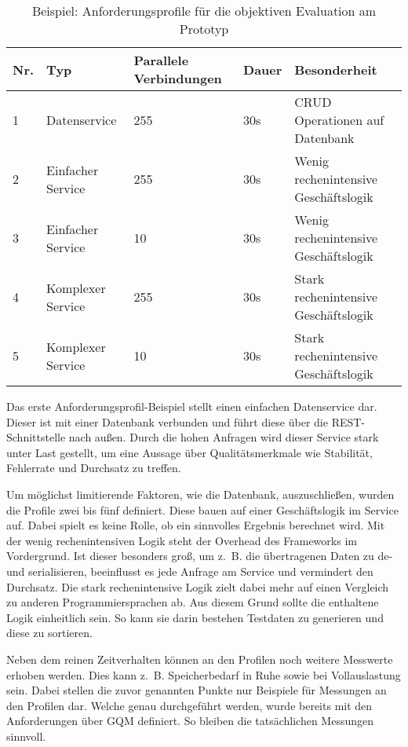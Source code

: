 \begin{table}[!h]
	\centering
	\begin{tabular}{p{1cm}p{4cm}p{2cm}p{2cm}p{4cm}}
		\textbf{Nr.} & \textbf{Typ} & \textbf{Parallele Verbindungen} & 
		\textbf{Dauer} & \textbf{Besonderheit} \\
		\hline
		1 	& Datenservice 			& 255	&	30s		& CRUD Operationen auf Datenbank  \\
		\hline
		2	& Einfacher Service		& 255 	&	30s		& Wenig rechenintensive Geschäftslogik   \\
		\hline
		3	& Einfacher Service		& 10 	&	30s		& Wenig rechenintensive Geschäftslogik   \\
		\hline
		4	& Komplexer Service 	& 255	&	30s		& Stark rechenintensive Geschäftslogik  \\
		\hline
		5	& Komplexer Service 	& 10	&	30s		& Stark rechenintensive Geschäftslogik  \\
		\hline
	\end{tabular}
	\caption[Anforderungsprofile]{Beispiel: Anforderungsprofile für die objektiven Evaluation am Prototyp}
	\label{Anforderungsprofile}
\end{table}

Das erste Anforderungsprofil-Beispiel stellt einen einfachen Datenservice dar. Dieser ist mit einer Datenbank verbunden und führt diese über die \ac{REST}-Schnittstelle nach außen. Durch die hohen Anfragen wird dieser Service stark unter Last gestellt, um eine Aussage über Qualitätsmerkmale wie Stabilität, Fehlerrate und Durchsatz zu treffen.

Um möglichst limitierende Faktoren, wie die Datenbank, auszuschließen, wurden die Profile zwei bis fünf definiert. Diese bauen auf einer Geschäftslogik im Service auf. Dabei spielt es keine Rolle, ob ein sinnvolles Ergebnis berechnet wird. Mit der wenig rechenintensiven Logik steht der Overhead des Frameworks im Vordergrund. Ist dieser besonders groß, um z.~B. die übertragenen Daten zu de- und serialisieren, beeinflusst es jede Anfrage am Service und vermindert den Durchsatz. Die stark rechenintensive Logik zielt dabei mehr auf einen Vergleich zu anderen Programmiersprachen ab. Aus diesem Grund sollte die enthaltene Logik einheitlich sein. So kann sie darin bestehen Testdaten zu generieren und diese zu sortieren.

Neben dem reinen Zeitverhalten können an den Profilen noch weitere Messwerte erhoben werden. Dies kann z.~B. Speicherbedarf in Ruhe sowie bei Vollauslastung sein. Dabei stellen die zuvor genannten Punkte nur Beispiele für Messungen an den Profilen dar. Welche genau durchgeführt werden, wurde bereits mit den Anforderungen über \ac{GQM} definiert. So bleiben die tatsächlichen Messungen sinnvoll.

